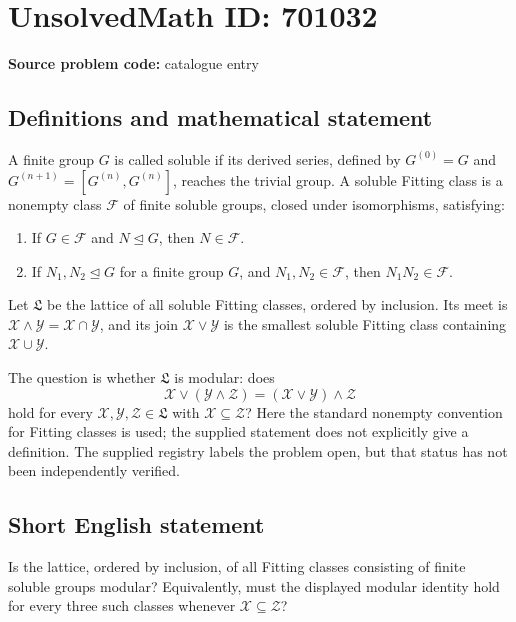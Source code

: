 \documentclass[11pt]{article}
\begin{document}
\section*{UnsolvedMath ID: 701032}
\textbf{Source problem code:} catalogue entry
\subsection{Definitions and mathematical statement}
A finite group \(G\) is called soluble if its derived series, defined by \(G^{(0)}=G\) and \(G^{(n+1)}=[G^{(n)},G^{(n)}]\), reaches the trivial group. A soluble Fitting class is a nonempty class \(\mathcal F\) of finite soluble groups, closed under isomorphisms, satisfying:
\begin{enumerate}
\item If \(G\in\mathcal F\) and \(N\trianglelefteq G\), then \(N\in\mathcal F\).
\item If \(N_1,N_2\trianglelefteq G\) for a finite group \(G\), and \(N_1,N_2\in\mathcal F\), then \(N_1N_2\in\mathcal F\).
\end{enumerate}
Let \(\mathfrak L\) be the lattice of all soluble Fitting classes, ordered by inclusion. Its meet is \(\mathcal X\wedge\mathcal Y=\mathcal X\cap\mathcal Y\), and its join \(\mathcal X\vee\mathcal Y\) is the smallest soluble Fitting class containing \(\mathcal X\cup\mathcal Y\).

The question is whether \(\mathfrak L\) is modular: does
\[
\mathcal X\vee(\mathcal Y\wedge\mathcal Z)
=(\mathcal X\vee\mathcal Y)\wedge\mathcal Z
\]
hold for every \(\mathcal X,\mathcal Y,\mathcal Z\in\mathfrak L\) with \(\mathcal X\subseteq\mathcal Z\)? Here the standard nonempty convention for Fitting classes is used; the supplied statement does not explicitly give a definition. The supplied registry labels the problem open, but that status has not been independently verified.
\subsection{Short English statement}
Is the lattice, ordered by inclusion, of all Fitting classes consisting of finite soluble groups modular? Equivalently, must the displayed modular identity hold for every three such classes whenever \(\mathcal X\subseteq\mathcal Z\)?
\end{document}
